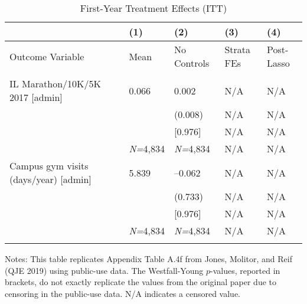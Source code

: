 \documentclass{article}
\begin{document}
\setlength{\tabcolsep}{6pt}
\begin{table}[tbp] \centering
{}

\caption{First-Year Treatment Effects (ITT)}
\label{tab:appendix_itt_health_vars_admin_0816_0717}
{\scriptsize
\begin{tabularx}{\linewidth}{lCCCC}

\toprule
&{(1)}&{(2)}&{(3)}&{(4)} \tabularnewline \midrule
{Outcome Variable}&{Mean}&{No Controls}&{Strata FEs}&{Post-Lasso} \tabularnewline
\midrule 
\addlinespace[1.4ex]
 \tabularnewline
\midrule IL Marathon/10K/5K 2017 [admin]&0.066&0.002&N/A&N/A \tabularnewline
&&(0.008)&N/A&N/A \tabularnewline
&&[0.976]&N/A&N/A \tabularnewline
&\textit{N=}4,834&\textit{N=}4,834&N/A&N/A \tabularnewline
\addlinespace[1.4ex]
Campus gym visits (days/year) [admin]&5.839&--0.062&N/A&N/A \tabularnewline
&&(0.733)&N/A&N/A \tabularnewline
&&[0.976]&N/A&N/A \tabularnewline
&\textit{N=}4,834&\textit{N=}4,834&N/A&N/A \tabularnewline
\bottomrule\addlinespace[-1.5ex] 

\end{tabularx}
\begin{flushleft}
\footnotesize Notes: This table replicates Appendix Table A.4f from Jones, Molitor, and Reif (QJE 2019) using public-use data. The Westfall-Young \(p\)-values, reported in brackets, do not exactly replicate the values from the original paper due to censoring in the public-use data. N/A indicates a censored value.
\end{flushleft}
}
\end{table}
\end{document}
